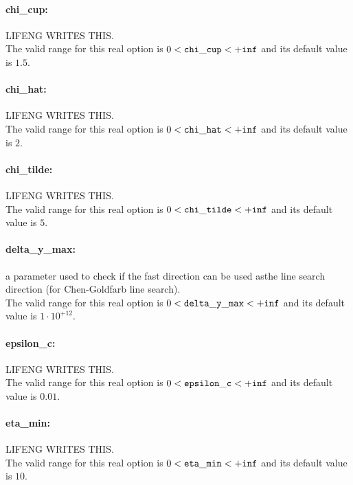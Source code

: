 \paragraph{chi\_cup:}\label{sec:chi_cup} LIFENG WRITES THIS. $\;$ \\
 The valid range for this real option is 
$0 <  {\tt chi\_cup } <  {\tt +inf}$
and its default value is $1.5$.


\paragraph{chi\_hat:}\label{sec:chi_hat} LIFENG WRITES THIS. $\;$ \\
 The valid range for this real option is 
$0 <  {\tt chi\_hat } <  {\tt +inf}$
and its default value is $2$.


\paragraph{chi\_tilde:}\label{sec:chi_tilde} LIFENG WRITES THIS. $\;$ \\
 The valid range for this real option is 
$0 <  {\tt chi\_tilde } <  {\tt +inf}$
and its default value is $5$.


\paragraph{delta\_y\_max:}\label{sec:delta_y_max} a parameter used to check if the fast direction can be used asthe line search direction (for Chen-Goldfarb line search). $\;$ \\
 The valid range for this real option is 
$0 <  {\tt delta\_y\_max } <  {\tt +inf}$
and its default value is $1 \cdot 10^{+12}$.


\paragraph{epsilon\_c:}\label{sec:epsilon_c} LIFENG WRITES THIS. $\;$ \\
 The valid range for this real option is 
$0 <  {\tt epsilon\_c } <  {\tt +inf}$
and its default value is $0.01$.


\paragraph{eta\_min:}\label{sec:eta_min} LIFENG WRITES THIS. $\;$ \\
 The valid range for this real option is 
$0 <  {\tt eta\_min } <  {\tt +inf}$
and its default value is $10$.


